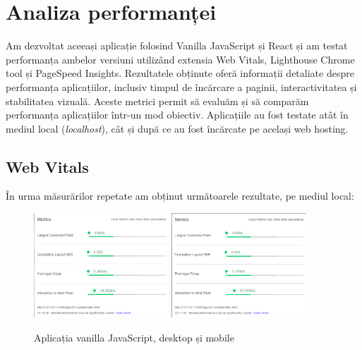 \documentclass[12pt, a4paper]{report}
\begin{document}
\section{Analiza performanței}

Am dezvoltat aceeași aplicație folosind Vanilla JavaScript și React și am testat performanța ambelor versiuni utilizând extensia Web Vitals, Lighthouse Chrome tool și PageSpeed Insights. Rezultatele obținute oferă informații detaliate despre performanța aplicațiilor, inclusiv timpul de încărcare a paginii, interactivitatea și stabilitatea vizuală. Aceste metrici permit să evaluăm și să comparăm performanța aplicațiilor într-un mod obiectiv. Aplicațiile au fost testate atât în mediul local (\emph{localhost}), cât și după ce au fost încărcate pe același web hosting.

\subsection{Web Vitals}

În urma măsurărilor repetate am obținut următoarele rezultate, pe mediul local:

\begin{figure}[htbp]
	\centering
	\includegraphics[width=0.45\textwidth]{01_desktop.png}
	\includegraphics[width=0.45\textwidth]{01_mobile.png}
	\caption{Aplicația vanilla JavaScript, desktop și mobile}
	\label{fig:01-local}
\end{figure}
\end{document}
